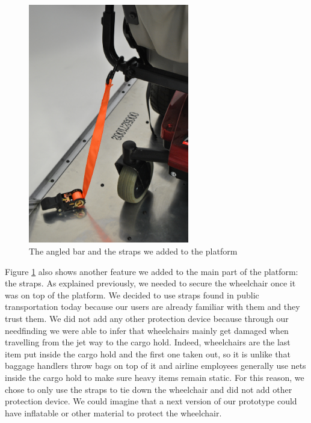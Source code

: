 \begin{figure}[h]
\centering
\includegraphics[width=7cm]{images/platform3.jpg}
\caption{The angled bar and the straps we added to the platform}
\label{fig:platform3}
\end{figure}
 
Figure \ref{fig:platform3} also shows another feature we added to the main part of the platform: the straps. As explained previously, we needed to secure the wheelchair once it was on top of the platform. We decided to use straps found in public transportation today because our users are already familiar with them and they trust them. We did not add any other protection device because through our needfinding we were able to infer that wheelchairs mainly get damaged when travelling from the jet way to the cargo hold. Indeed, wheelchairs are the last item put inside the cargo hold and the first one taken out, so it is unlike that baggage handlers throw bags on top of it and airline employees generally use nets inside the cargo hold to make sure heavy items remain static. For this reason, we chose to only use the straps to tie down the wheelchair and did not add other protection device. We could imagine that a next version of our prototype could have inflatable or other material to protect the wheelchair. 
 
